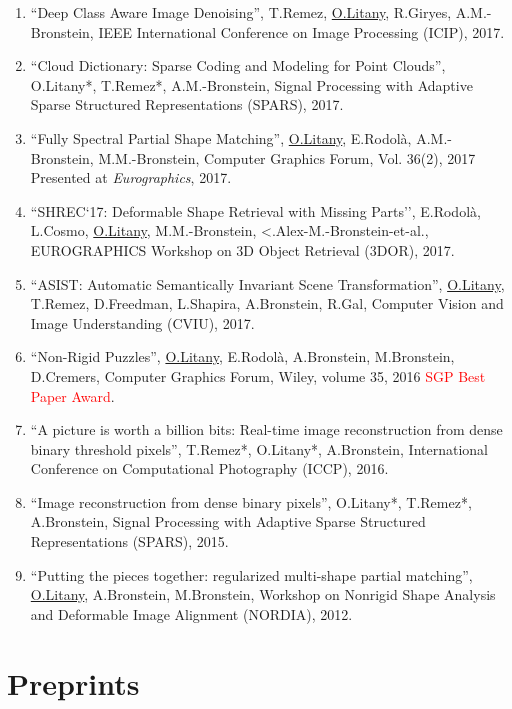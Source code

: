 \begin{enumerate}
\item ``Deep Class Aware Image Denoising'', T.Remez, \underline{O.Litany}, R.Giryes, A.M.-Bronstein, IEEE International Conference on Image Processing (ICIP), 2017.

\item ``Cloud Dictionary: Sparse Coding and Modeling for Point Clouds'', O.Litany*, T.Remez*, A.M.-Bronstein, Signal Processing with Adaptive Sparse Structured Representations (SPARS), 2017.

\item ``Fully Spectral Partial Shape Matching'', \underline{O.Litany}, E.Rodolà, A.M.-Bronstein, M.M.-Bronstein, Computer Graphics Forum, Vol. 36(2), 2017 Presented at \emph{Eurographics}, 2017.

\item ``SHREC`17: Deformable Shape Retrieval with Missing Parts'', E.Rodolà, L.Cosmo, \underline{O.Litany}, M.M.-Bronstein, <.Alex-M.-Bronstein-et-al., EUROGRAPHICS Workshop on 3D Object Retrieval (3DOR), 2017.

\item ``ASIST: Automatic Semantically Invariant Scene Transformation'', \underline{O.Litany}, T.Remez, D.Freedman, L.Shapira, A.Bronstein, R.Gal, Computer Vision and Image Understanding (CVIU), 2017.

\item ``Non-Rigid Puzzles'', \underline{O.Litany}, E.Rodolà, A.Bronstein, M.Bronstein, D.Cremers, Computer Graphics Forum, Wiley, volume 35, 2016 \textcolor{red}{SGP Best Paper Award}.

\item ``A picture is worth a billion bits: Real-time image reconstruction from dense binary threshold pixels'', T.Remez*, O.Litany*, A.Bronstein, International Conference on Computational Photography (ICCP), 2016.

\item ``Image reconstruction from dense binary pixels'', O.Litany*, T.Remez*, A.Bronstein, Signal Processing with Adaptive Sparse Structured Representations (SPARS), 2015.

\item ``Putting the pieces together: regularized multi-shape partial matching'', \underline{O.Litany}, A.Bronstein, M.Bronstein, Workshop on Nonrigid Shape Analysis and Deformable Image Alignment (NORDIA), 2012.

\end{enumerate}

\section{\sc Preprints}

